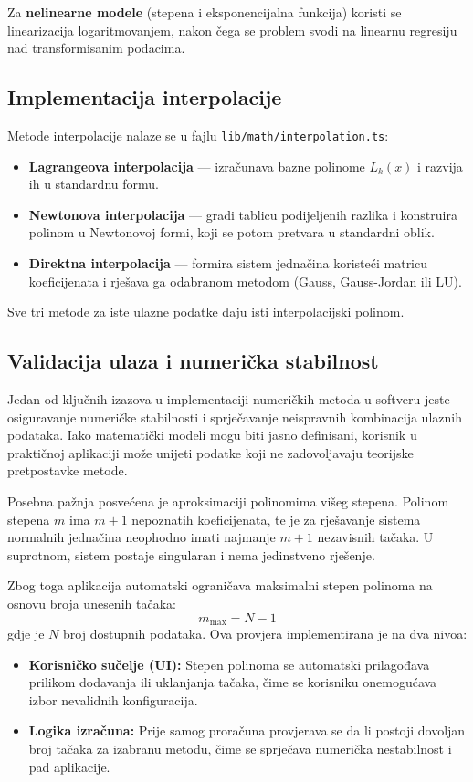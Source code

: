 \documentclass[12pt, a4paper]{article}
\begin{document}
Za \textbf{nelinearne modele} (stepena i eksponencijalna funkcija)
koristi se linearizacija logaritmovanjem, nakon čega se problem
svodi na linearnu regresiju nad transformisanim podacima.

\subsection{Implementacija interpolacije}

Metode interpolacije nalaze se u fajlu \texttt{lib/math/interpolation.ts}:

\begin{itemize}
    \item \textbf{Lagrangeova interpolacija} --- izračunava bazne polinome
    $L_k(x)$ i razvija ih u standardnu formu.
    \item \textbf{Newtonova interpolacija} --- gradi tablicu podijeljenih
    razlika i konstruira polinom u Newtonovoj formi, koji se potom
    pretvara u standardni oblik.
    \item \textbf{Direktna interpolacija} --- formira sistem jednačina
    koristeći matricu koeficijenata i rješava ga odabranom metodom
    (Gauss, Gauss-Jordan ili LU).
\end{itemize}

Sve tri metode za iste ulazne podatke daju isti interpolacijski polinom.

\subsection{Validacija ulaza i numerička stabilnost}

Jedan od ključnih izazova u implementaciji numeričkih metoda u softveru
jeste osiguravanje numeričke stabilnosti i sprječavanje neispravnih
kombinacija ulaznih podataka. Iako matematički modeli mogu biti jasno
definisani, korisnik u praktičnoj aplikaciji može unijeti podatke koji
ne zadovoljavaju teorijske pretpostavke metode.

Posebna pažnja posvećena je aproksimaciji polinomima višeg stepena.
Polinom stepena $m$ ima $m+1$ nepoznatih koeficijenata, te je za rješavanje
sistema normalnih jednačina neophodno imati najmanje $m+1$ nezavisnih
tačaka. U suprotnom, sistem postaje singularan i nema jedinstveno rješenje.

Zbog toga aplikacija automatski ograničava maksimalni stepen polinoma
na osnovu broja unesenih tačaka:
\[
m_{\text{max}} = N - 1
\]
gdje je $N$ broj dostupnih podataka. Ova provjera implementirana je
na dva nivoa:
\begin{itemize}
    \item \textbf{Korisničko sučelje (UI):} Stepen polinoma se automatski
    prilagođava prilikom dodavanja ili uklanjanja tačaka, čime se korisniku
    onemogućava izbor nevalidnih konfiguracija.
    \item \textbf{Logika izračuna:} Prije samog proračuna provjerava se da li
    postoji dovoljan broj tačaka za izabranu metodu, čime se sprječava
    numerička nestabilnost i pad aplikacije.
\end{itemize}
\end{document}
